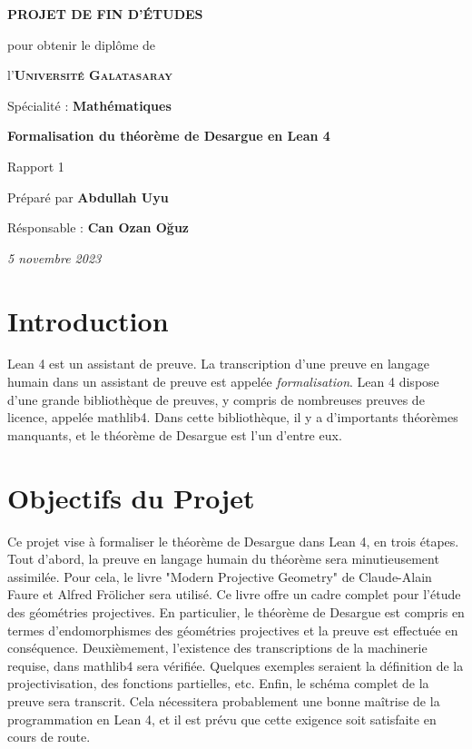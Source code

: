 \documentclass[12pt, oneside]{memoir}
\theoremstyle{definition}
\begin{document}
\thispagestyle{empty}
\begin{center}
  \vspace*{\fill}
  

  \vspace{1cm}
  \large{\textbf{PROJET DE FIN D'ÉTUDES}}

  \vspace{0.5cm}
  {\small pour obtenir le diplôme de}

  \vspace{0.5cm}
  l'\textsc{\textbf{Université Galatasaray}}

  {\small Spécialité : \textbf{Mathématiques}}

  \vspace{2.25cm}
  {\Large\textbf{Formalisation du théorème de Desargue en Lean 4}}

  Rapport 1

  \vspace{1.25cm}
  Préparé par \textbf{Abdullah Uyu}

  Résponsable : \textbf{Can Ozan Oğuz}

  \vspace{2.25cm}
  \textit{5 novembre 2023}
  \vspace*{\fill}
\end{center}
\clearpage
{}
\section*{Introduction}
Lean 4 est un assistant de preuve. La transcription d'une preuve en
langage humain dans un assistant de preuve est appelée
\textit{formalisation}. Lean 4 dispose d'une grande bibliothèque de
preuves, y compris de nombreuses preuves de licence, appelée
mathlib4. Dans cette bibliothèque, il y a d'importants théorèmes
manquants, et le théorème de Desargue est l'un d'entre eux.
\section*{Objectifs du Projet}
Ce projet vise à formaliser le théorème de Desargue dans Lean 4, en
trois étapes. Tout d'abord, la preuve en langage humain du théorème
sera minutieusement assimilée. Pour cela, le livre "Modern Projective
Geometry" de Claude-Alain Faure et Alfred Frölicher sera utilisé. Ce
livre offre un cadre complet pour l'étude des géométries
projectives. En particulier, le théorème de Desargue est compris en
termes d'endomorphismes des géométries projectives et la preuve est
effectuée en conséquence. Deuxièmement, l'existence des transcriptions
de la machinerie requise, dans mathlib4 sera vérifiée. Quelques
exemples seraient la définition de la projectivisation, des fonctions
partielles, etc. Enfin, le schéma complet de la preuve sera
transcrit. Cela nécessitera probablement une bonne maîtrise de la
programmation en Lean 4, et il est prévu que cette exigence soit
satisfaite en cours de route.
\end{document}
